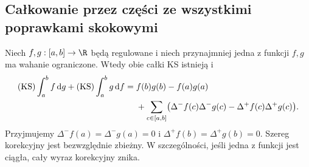 \subsection*{Całkowanie przez części ze wszystkimi poprawkami skokowymi}
\begin{twierdzenie}
\label{tw:ks-ibp}
Niech $f,g:[a,b]\to\R$ będą regulowane i niech przynajmniej jedna z funkcji $f,g$ ma wahanie ograniczone. Wtedy obie całki KS istnieją i
\[
 \begin{aligned}
 (\mathrm{KS})\int_a^b f\,\mathrm dg+(\mathrm{KS})\int_a^b g\,\mathrm df
 ={}&f(b)g(b)-f(a)g(a)\\
 &+\sum_{c\in[a,b]}\bigl(\Delta^-f(c)\Delta^-g(c)
 -\Delta^+f(c)\Delta^+g(c)\bigr).
 \end{aligned}
\]
Przyjmujemy $\Delta^-f(a)=\Delta^-g(a)=0$ i $\Delta^+f(b)=\Delta^+g(b)=0$. Szereg korekcyjny jest bezwzględnie zbieżny. W szczególności, jeśli jedna z funkcji jest ciągła, cały wyraz korekcyjny znika.
\end{twierdzenie}
